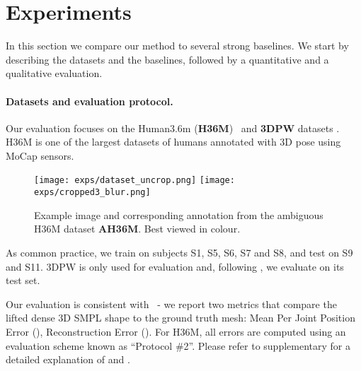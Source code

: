 \section{Experiments}\label{s:exp}

In this section we compare our method to several strong baselines.
We start by describing the datasets and the baselines, followed by a quantitative and a qualitative evaluation.





\paragraph{Datasets and evaluation protocol.}

Our evaluation focuses on the Human3.6m (\textbf{H36M})~\cite{ionescu2013human3,IonescuSminchisescu11} 
and \textbf{3DPW} datasets \cite{vonmarcard2018recovering}.
H36M is one of the largest datasets of humans annotated with 3D pose using MoCap sensors.
\begin{wrapfigure}{r}{0.45\textwidth}
  \begin{center}
           \texttt{[image: exps/dataset\_uncrop.png]}
    \texttt{[image: exps/cropped3\_blur.png]}
  \end{center}
    \caption{Example image and corresponding annotation from the ambiguous H36M dataset \textbf{AH36M}. Best viewed in colour.\label{f:ambi_samples}}
    \vspace{-1.8em}
\end{wrapfigure}
As common practice, we train on subjects S1, S5, S6, S7 and S8, and test on S9 and S11. 3DPW is only used for evaluation and, following \cite{kolotouros19convolutional}, we evaluate on its test set.

Our evaluation is consistent with~\cite{kolotouros19learning,kolotouros19convolutional} - we report two metrics that compare the lifted dense 3D SMPL shape to the ground truth mesh: Mean Per Joint Position Error (\textbf{\MPJPE}), Reconstruction Error (\textbf{\RE}). 
For H36M, all errors are computed using an evaluation scheme known as ``Protocol \#2''. Please refer to supplementary for a detailed explanation of \MPJPE and \RE.


